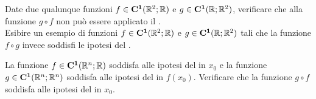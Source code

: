 \begin{exercise}
	Date due qualunque funzioni $f \in \mathbf{C^{1}}(\mathbb{R}^2;\mathbb{R})$ e $g \in \mathbf{C^{1}}(\mathbb{R};\mathbb{R}^2)$, verificare che alla funzione $g \circ f$ non può essere applicato il .\\
	Esibire un esempio di funzioni $f \in \mathbf{C^{1}}(\mathbb{R}^2;\mathbb{R})$ e $g \in \mathbf{C^{1}}(\mathbb{R};\mathbb{R}^2)$ tali che la funzione $f \circ g$ invece soddisfi le ipotesi del .
\end{exercise}
\begin{exercise}
	La funzione $f \in \mathbf{C^{1}}(\mathbb{R}^n;\mathbb{R})$ soddisfa alle ipotesi del  in $x_0$ e la funzione $g \in \mathbf{C^{1}}(\mathbb{R}^n; \mathbb{R}^n)$ soddisfa alle ipotesi del  in $f(x_0)$. Verificare che la funzione $g \circ f$ soddisfa alle ipotesi del  in $x_0$.
\end{exercise}

\newpage
